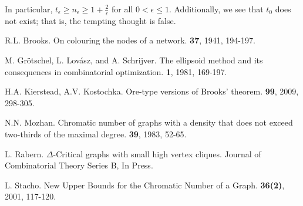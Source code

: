 \documentclass[12pt]{amsart}
\theoremstyle{plain}
\theoremstyle{definition}
\theoremstyle{remark}
\begin{document}
\noindent In particular, $t_\epsilon \geq n_\epsilon \geq 1 + \frac{2}{\epsilon}$ for all $0 < \epsilon \leq 1$. Additionally, we see that $t_0$ does not exist; that is, the tempting thought is false.


\begin{thebibliography}{1}
R.L. Brooks. 
\newblock On colouring the nodes of a network.
 \textbf{37}, 1941, \mbox{194-197.}

M. Gr\"{o}tschel, L. Lov\'{a}sz, and A. Schrijver.
\newblock The ellipsoid method and its consequences in combinatorial optimization.
 \textbf{1}, 1981, \mbox{169-197}.

H.A. Kierstead, A.V. Kostochka.
\newblock Ore-type versions of Brooks' theorem.
 \textbf{99}, 2009, \mbox{298-305.}

N.N. Mozhan.
\newblock Chromatic number of graphs with a density that does not exceed two-thirds of the maximal degree.
 \textbf{39}, 1983, \mbox{52-65.}

L. Rabern.
\newblock $\Delta$-Critical graphs with small high vertex cliques.
\newblock Journal of Combinatorial Theory Series B, In Press.

L. Stacho.
\newblock New Upper Bounds for the Chromatic Number of a Graph.
 \textbf{36(2)}, 2001, \mbox{117-120.}

\end{thebibliography}
\end{document}
